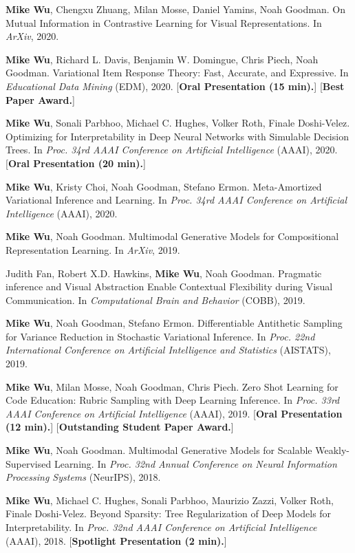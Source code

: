 \documentclass[margin, 10pt]{res} %
\begin{document}
\begin{resume}
\textbf{Mike Wu}, Chengxu Zhuang, Milan Mosse, Daniel Yamins, Noah Goodman. On Mutual Information in Contrastive Learning for Visual Representations. In \textit{ArXiv}, 2020.

\textbf{Mike Wu}, Richard L. Davis, Benjamin W. Domingue, Chris Piech, Noah Goodman. Variational Item Response Theory: Fast, Accurate, and Expressive. In \textit{Educational Data Mining} (EDM), 2020. [\textbf{Oral Presentation (15 min).}] [\textbf{Best Paper Award.}]

\textbf{Mike Wu}, Sonali Parbhoo, Michael C. Hughes, Volker Roth, Finale Doshi-Velez. Optimizing for Interpretability in Deep Neural Networks with Simulable Decision Trees. In \textit{Proc. 34rd AAAI Conference on Artificial Intelligence} (AAAI), 2020. [\textbf{Oral Presentation (20 min).}]

\textbf{Mike Wu}, Kristy Choi, Noah Goodman, Stefano Ermon. Meta-Amortized Variational Inference and Learning. In \textit{Proc. 34rd AAAI Conference on Artificial Intelligence} (AAAI), 2020.

\textbf{Mike Wu}, Noah Goodman. Multimodal Generative Models for Compositional Representation Learning. In \textit{ArXiv}, 2019.

Judith Fan, Robert X.D. Hawkins, \textbf{Mike Wu}, Noah Goodman. Pragmatic inference and Visual Abstraction Enable Contextual Flexibility during Visual Communication. In \textit{Computational Brain and Behavior} (COBB), 2019.

\textbf{Mike Wu}, Noah Goodman, Stefano Ermon. Differentiable Antithetic Sampling for Variance Reduction in Stochastic Variational Inference. In \textit{Proc. 22nd International Conference on Artificial Intelligence and Statistics} (AISTATS), 2019.

\textbf{Mike Wu}, Milan Mosse, Noah Goodman, Chris Piech. Zero Shot Learning for Code Education: Rubric Sampling with Deep Learning Inference. In \textit{Proc. 33rd AAAI Conference on Artificial Intelligence} (AAAI), 2019. [\textbf{Oral Presentation (12 min).}] [\textbf{Outstanding Student Paper Award.}]

\textbf{Mike Wu}, Noah Goodman. Multimodal Generative Models for Scalable Weakly-Supervised Learning. In \textit{Proc. 32nd Annual Conference on Neural Information Processing Systems} (NeurIPS), 2018.

\textbf{Mike Wu}, Michael C. Hughes, Sonali Parbhoo, Maurizio Zazzi, Volker Roth, Finale Doshi-Velez. Beyond Sparsity: Tree Regularization of Deep Models for Interpretability. In \textit{Proc. 32nd AAAI Conference on Artificial Intelligence} (AAAI), 2018. [\textbf{Spotlight Presentation (2 min).}]


\end{resume}
\end{document}
